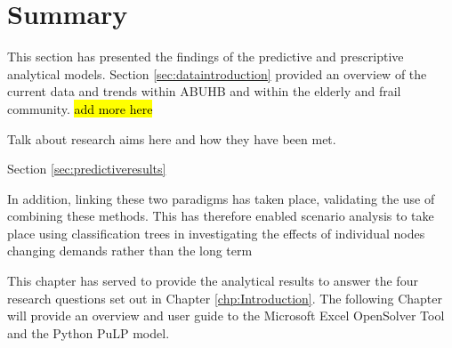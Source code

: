 \documentclass[../thesis.tex]{subfiles}
\begin{document}
\section{Summary}
This section has presented the findings of the predictive and prescriptive analytical models. Section \ref{sec:dataintroduction} provided an overview of the current data and trends within ABUHB and within the elderly and frail community. 
\hl{add more here}


Talk about research aims here and how they have been met.

Section \ref{sec:predictiveresults} 



In addition, linking these two paradigms has taken place, validating the use of combining these methods. This has therefore enabled scenario analysis to take place using classification trees in investigating the effects of individual nodes changing demands rather than the long term 

This chapter has served to provide the analytical results to answer the four research questions set out in Chapter \ref{chp:Introduction}. The following Chapter will provide an overview and user guide to the Microsoft Excel OpenSolver Tool and the Python PuLP model.
\end{document}
